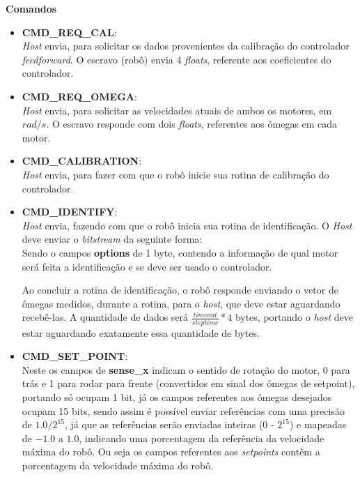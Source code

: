 \textbf{Comandos}
\begin{itemize}
    \item \textbf{CMD\_REQ\_CAL}:\\
        \textit{Host} envia, para solicitar os dados provenientes da calibração do controlador \textit{feedforward}. O escravo (robô) envia 4 \emph{floats}, referente aos coeficientes do controlador.
    \item \textbf{CMD\_REQ\_OMEGA}:\\
        \textit{Host} envia, para solicitar as velocidades atuais de ambos os motores, em $rad/s$. O escravo responde com dois \emph{floats}, referentes aos ômegas em cada motor.
    \item \textbf{CMD\_CALIBRATION}:\\
        \textit{Host} envia, para fazer com que o robô inicie sua rotina de calibração do controlador.
    \item \textbf{CMD\_IDENTIFY}:\\
        \textit{Host} envia, fazendo com que o robô inicia sua rotina de identificação. O \textit{Host} deve enviar o \emph{bitstream} da seguinte forma:\\
        
        
        
        Sendo o campos \textbf{options} de 1 byte, contendo a informação de qual motor será feita a identificação e se deve ser usado o controlador.
        
        Ao concluir a rotina de identificação, o robô responde enviando o vetor de ômegas medidos, durante a rotina, para o \textit{host}, que deve estar aguardando recebê-las. A quantidade de dados será $\frac{timeout}{steptime}*4$ bytes, portando o \textit{host} deve estar aguardando exatamente essa quantidade de bytes.
        
        
    \item \textbf{CMD\_SET\_POINT}:\\
        
        
        
        Neste os campos de \textbf{sense\_x} indicam o sentido de rotação do motor, 0 para trás e 1 para rodar para frente (convertidos em sinal dos ômegas de setpoint), portando só ocupam 1 bit, já os campos referentes aos ômegas desejados ocupam 15 bits, sendo assim é possível enviar referências com uma precisão de $1.0/2^{15}$, já que as referências serão enviadas inteiras  (0 - $2^{15}$) e mapeadas de $-1.0$ a $1.0$, indicando uma porcentagem da referência da velocidade máxima do robô. Ou seja os campos referentes aos \textit{setpoints} contêm a porcentagem da velocidade máxima do robô.
        

\end{itemize}
